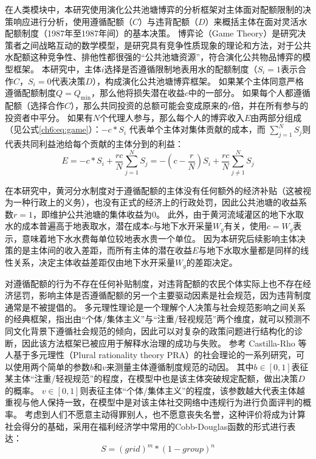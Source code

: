在人类模块中，本研究使用演化公共池塘博弈的分析框架对主体面对配额限制的决策响应进行分析，使用遵循配额（$C$）与违背配额（$D$）来概括主体在面对灵活水配额制度（1987年至1987年间）的基本决策。
博弈论（Game Theory）是研究决策者之间战略互动的数学模型，是研究具有竞争性质现象的理论和方法，对于公共水配额这种竞争性、排他性都很强的“公共池塘资源”，符合演化公共物品博弈的模型框架\cite{ostrom2009, traulsen2010}。
本研究中，主体$i$选择是否遵循限制地表用水的配额制度（$S_i = 1$表示合作$C$，$S_i=0$代表决策$D$），构成演化公共池塘博弈框架。
如果某个主体同意严格遵循配额制度$Q = Q_{\min}$，那么他将损失潜在收益$c$中的一部分。
如果每个人都遵循配额（选择合作$C$），那么共同投资的总额可能会变成原来的$r$倍，并在所有参与的投资者中平分。
如果有$N$个代理人参与，那么每个人的博弈收入$E$由两部分组成（见公式\ref{ch6:eq:game}）：$-c*S_i$ 代表单个主体对集体贡献的成本，而 $\sum_{j=1}^N S_j$则代表共同利益池给每个贡献的主体分到的利益：
\begin{equation}
    \label{ch6:eq:game}
    E=-c * S_i+\frac{r c}{N} \sum_{j=1}^N S_j=-\left(c-\frac{r}{N}\right) S_i+\frac{r c}{N} \sum_{j \neq 1}^N S_j
\end{equation}

在本研究中，黄河分水制度对于遵循配额的主体没有任何额外的经济补贴（这被视为一种行政上的义务），也没有正式的经济上的行政处罚，因此公共池塘的收益系数$r = 1$，即维护公共池塘的集体收益为$0$。
此外，由于黄河流域灌区的地下水取水的成本普遍高于地表取水，潜在成本$c$与地下水开采量$W_g$有关，使用$c = W_g$表示，意味着地下水水费每单位较地表水贵一个单位。
因为本研究后续影响主体决策的是主体间的收入差距，而所有主体的潜在收益$E$与地下水取水量都是同样的线性关系，决定主体收益差距仅由地下水开采量$W_g$的差距决定。

对遵循配额的行为不存在任何补贴制度，对违背配额的农民个体实际上也不存在经济惩罚，影响主体是否遵循配额的另一个主要驱动因素是社会规范，因为违背制度通常是不被提倡的。
多元理性理论是一个理解个人决策与社会规范影响之间关系的经典框架，指出由“个体/集体主义”与“注重/轻视规范”两个维度，就可以预测不同文化背景下遵循社会规范的倾向\cite{verweij2015}，因此可以对复杂的政策问题进行结构化的诊断，因此该方法框架已被应用于解释水治理的成功与失败。
参考 Castilla-Rho 等人基于多元理性（Plural rationality theory PRA）的社会理论的一系列研究，可以使用两个简单的参数$b$和$v$来测量主体遵循制度规范的动因\cite{castilla-rho2015, castilla-rho2017, castilla-rho2020}。
其中$b\in[0, 1]$表征某主体“注重/轻视规范”的程度，在模型中也是该主体突破规定配额，做出决策$D$的概率。
$v \in [0, 1]$则表征主体“个体/集体主义”的程度，该参数越大代表主体越重视与他人保持一致，在模型中是对该主体社交网络中违规行为进行负面评判的概率。
考虑到人们不愿意主动得罪别人，也不愿意丧失名誉，这种评价将成为计算社会得分的基础，采用在福利经济学中常用的Cobb-Douglas函数的形式进行表达：
\begin{equation}
    S = {(grid)}^m * {(1 - group)}^n
    \label{ch6:eq:society}
\end{equation}

